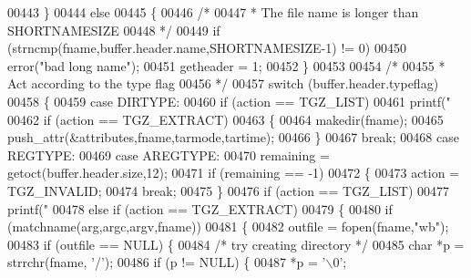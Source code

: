 \begin{DoxyCode}
{{{{00443             \}
00444           \textcolor{keywordflow}{else}
00445             \{
00446               \textcolor{comment}{/*}
00447 \textcolor{comment}{               * The file name is longer than SHORTNAMESIZE}
00448 \textcolor{comment}{               */}
00449               \textcolor{keywordflow}{if} (strncmp(fname,buffer.header.name,SHORTNAMESIZE-1) != 0)
00450                   error(\textcolor{stringliteral}{"bad long name"});
00451               getheader = 1;
00452             \}
00453 
00454           \textcolor{comment}{/*}
00455 \textcolor{comment}{           * Act according to the type flag}
00456 \textcolor{comment}{           */}
00457           \textcolor{keywordflow}{switch} (buffer.header.typeflag)
00458             \{
00459             \textcolor{keywordflow}{case} DIRTYPE:
00460               \textcolor{keywordflow}{if} (action == TGZ\_LIST)
00461                 printf(\textcolor{stringliteral}{" %
00462               \textcolor{keywordflow}{if} (action == TGZ\_EXTRACT)
00463                 \{
00464                   makedir(fname);
00465                   push\_attr(&attributes,fname,tarmode,tartime);
00466                 \}
00467               \textcolor{keywordflow}{break};
00468             \textcolor{keywordflow}{case} REGTYPE:
00469             \textcolor{keywordflow}{case} AREGTYPE:
00470               remaining = getoct(buffer.header.size,12);
00471               \textcolor{keywordflow}{if} (remaining == -1)
00472                 \{
00473                   action = TGZ\_INVALID;
00474                   \textcolor{keywordflow}{break};
00475                 \}
00476               \textcolor{keywordflow}{if} (action == TGZ\_LIST)
00477                 printf(\textcolor{stringliteral}{" %
00478               \textcolor{keywordflow}{else} \textcolor{keywordflow}{if} (action == TGZ\_EXTRACT)
00479                 \{
00480                   \textcolor{keywordflow}{if} (matchname(arg,argc,argv,fname))
00481                     \{
00482                       outfile = fopen(fname,\textcolor{stringliteral}{"wb"});
00483                       \textcolor{keywordflow}{if} (outfile == NULL) \{
00484                         \textcolor{comment}{/* try creating directory */}
00485                         \textcolor{keywordtype}{char} *p = strrchr(fname, \textcolor{charliteral}{'/'});
00486                         \textcolor{keywordflow}{if} (p != NULL) \{
00487                           *p = \textcolor{charliteral}{'\(\backslash\)0'};
}}}}}}
\end{DoxyCode}
